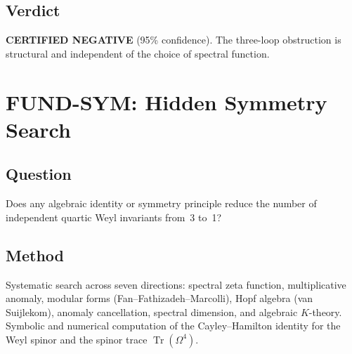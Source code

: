 \documentclass[12pt,a4paper]{article}
\newcommand{\Tr}{\operatorname{Tr}}
\begin{document}
\subsection{Verdict}
\textcolor{long}{\textbf{CERTIFIED NEGATIVE}} (95\% confidence).  The
three-loop obstruction is structural and independent of the choice of spectral
function.

\section{FUND-SYM: Hidden Symmetry Search}
\label{sec:sym}

\subsection{Question}
Does any algebraic identity or symmetry principle reduce the number of
independent quartic Weyl invariants from~3 to~1?

\subsection{Method}
Systematic search across seven directions: spectral zeta function, multiplicative
anomaly, modular forms (Fan--Fathizadeh--Marcolli), Hopf algebra (van Suijlekom),
anomaly cancellation, spectral dimension, and algebraic $K$-theory.  Symbolic and
numerical computation of the Cayley--Hamilton identity for the Weyl spinor and
the spinor trace $\Tr(\Omega^4)$.
\end{document}
